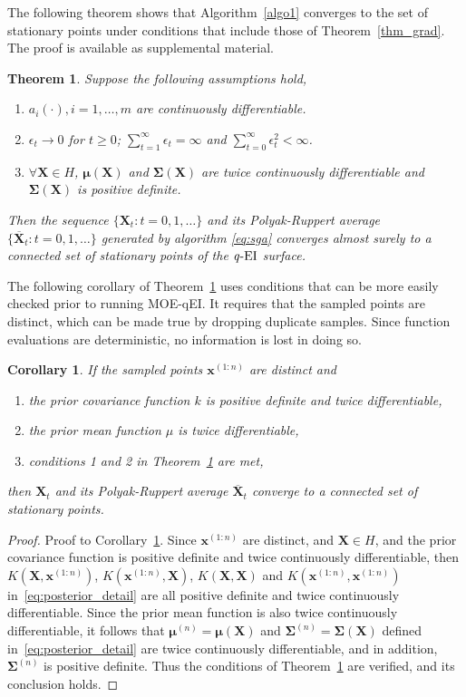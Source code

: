 \documentclass[paper=letter]{scrartcl}
\newcommand{\x}[1]{\bm{x}^{(#1)}}
\newcommand{\bmu}[1]{\bm{\mu}^{(#1)}}
\newcommand{\Sig}[1]{\bm{\Sigma}^{(#1)}} %
\newcommand{\qEI}{\text{\textit q-EI}}
\newtheorem{theorem}{Theorem}
\newtheorem{corollary}{Corollary}
\begin{document}
The following theorem shows that Algorithm~\ref{algo1} converges to the set of stationary points
under conditions that include those of Theorem~\ref{thm_grad}.
The proof is available as supplemental material.
\begin{theorem} \label{thm:sga}
  Suppose the following assumptions hold,
  \begin{enumerate}
    \item 
      $a_i(\cdot), i = 1, \ldots, m$ are continuously differentiable.
    \item
      $\epsilon_t \rightarrow 0$ for $t \geq 0$; $\sum_{t=1}^{\infty} \epsilon_t = \infty$ and $\sum_{t=0}^{\infty} \epsilon_t^2 < \infty$.
    \item
      $\forall \bm{X} \in H$, $\bm{\mu}(\bm{X})$ and $\bm{\Sigma}(\bm{X})$ are twice continuously differentiable and $\bm{\Sigma}(\bm{X})$ 
      is positive definite.
  \end{enumerate}
 Then the sequence $\{\bm{X}_t: t=0,1,\ldots\}$ and its Polyak-Ruppert average $\{\overline{\bm{X}}_t : t=0,1,\ldots\}$ generated by algorithm 
 \eqref{eq:sga} converges almost surely to a connected set of stationary points of the $\qEI$ surface.
\end{theorem}

The following corollary of Theorem~\ref{thm:sga} uses conditions that can be more easily checked prior to running MOE-qEI.  It requires that the sampled points are distinct, which can be made true by dropping duplicate samples.  Since function evaluations are deterministic, no information is lost in doing so. 

\begin{corollary} \label{corollary}
If the sampled points $\x{1:n}$ are distinct and 
\begin{enumerate}
    \item the prior covariance function $k$ is positive definite and twice differentiable,
    \item the prior mean function $\mu$ is twice differentiable,
    \item conditions 1 and 2 in Theorem~\ref{thm:sga} are met,
\end{enumerate}
then $\bm{X}_t$ and its Polyak-Ruppert average $\overline{\bm{X}}_t$ converge to a connected set of stationary points.
\end{corollary}
\begin{proof}{Proof to Corollary~\ref{corollary}.}
Since $\x{1:n}$ are distinct, and $\bm{X} \in H$, and the prior covariance function is positive definite and twice continuously differentiable, then $K\left(\bm{X}, \bm{x}^{(1:n)}\right)$, $K\left(\bm{x}^{(1:n)}, \bm{X}\right)$, $K\left(\bm{X}, \bm{X}\right)$ and $K\left(\bm{x}^{(1:n)}, \bm{x}^{(1:n)}\right)$ in~\eqref{eq:posterior_detail} are all positive definite and twice continuously differentiable. Since
the prior mean function is also twice continuously differentiable, it follows that $\bmu{n}=\bm{\mu}(\bm{X})$ and $\Sig{n}=\bm{\Sigma}(\bm{X})$ defined in~\eqref{eq:posterior_detail} are twice continuously differentiable, and in addition, $\Sig{n}$ is positive definite. Thus the conditions of Theorem~\ref{thm:sga} are verified, and
its conclusion holds.
\end{proof}
\end{document}
